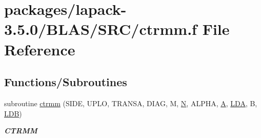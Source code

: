 \hypertarget{lapack-3_85_80_2BLAS_2SRC_2ctrmm_8f}{}\section{packages/lapack-\/3.5.0/\+B\+L\+A\+S/\+S\+R\+C/ctrmm.f File Reference}
\label{lapack-3_85_80_2BLAS_2SRC_2ctrmm_8f}
\subsection*{Functions/\+Subroutines}
\begin{DoxyCompactItemize}
\item 
subroutine \hyperlink{group__complex__blas__level3_gad7c297c05b482699b6d60a29c8d4a165}{ctrmm} (S\+I\+D\+E, U\+P\+L\+O, T\+R\+A\+N\+S\+A, D\+I\+A\+G, M, \hyperlink{polmisc_8c_a0240ac851181b84ac374872dc5434ee4}{N}, A\+L\+P\+H\+A, \hyperlink{classA}{A}, \hyperlink{example__user_8c_ae946da542ce0db94dced19b2ecefd1aa}{L\+D\+A}, B, \hyperlink{example__user_8c_a50e90a7104df172b5a89a06c47fcca04}{L\+D\+B})
\begin{DoxyCompactList}\small\item\em {\bfseries C\+T\+R\+M\+M} \end{DoxyCompactList}\end{DoxyCompactItemize}
